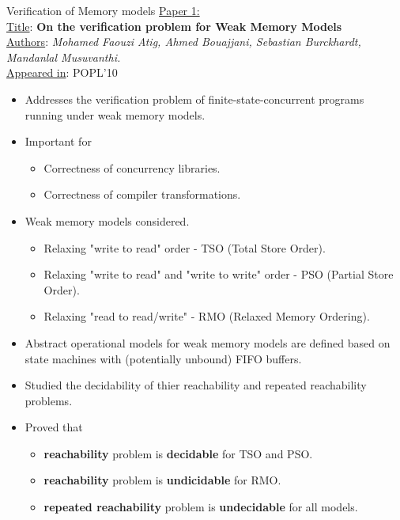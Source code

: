 \documentclass[9pt]{beamer}
\begin{document}
\begin{frame}{Verification of Memory models}
\underline{Paper 1:}\\
\vspace{0.3cm}
\underline{Title}: \textbf{On the verification problem for Weak Memory Models}\\
\underline{Authors}: {\em Mohamed Faouzi Atig, Ahmed Bouajjani, Sebastian Burckhardt, Mandanlal Musuvanthi.}\\
\underline{Appeared in}: POPL'10\\
\pause
\vspace{0.3cm}
\begin{itemize}
\item Addresses the verification problem of finite-state-concurrent programs running under
      weak memory models.
\pause
\item Important for
	\begin{itemize}
  \item Correctness of concurrency libraries.
  \item Correctness of compiler transformations.
	\end{itemize}
\pause
\item Weak memory models considered.
  \begin{itemize}
  \item Relaxing "write to read" order - TSO (Total Store Order).
  \item Relaxing "write to read" and "write to write" order - PSO (Partial Store Order).
  \item Relaxing "read to read/write" - RMO (Relaxed Memory Ordering).
  \end{itemize}
\pause
\item Abstract operational models for weak memory models are defined based on state
      machines with (potentially unbound) FIFO buffers.
\pause
\item Studied the decidability of thier reachability and repeated reachability
      problems.
\pause
\item Proved that
	\begin{itemize}
  \item \textbf{reachability} problem is \textbf{decidable} for TSO and PSO.
  \item \textbf{reachability} problem is \textbf{undicidable} for RMO.
  \item \textbf{repeated reachability} problem is \textbf{undecidable} for all models.
	\end{itemize}
\end{itemize}
\end{frame}
\end{document}
